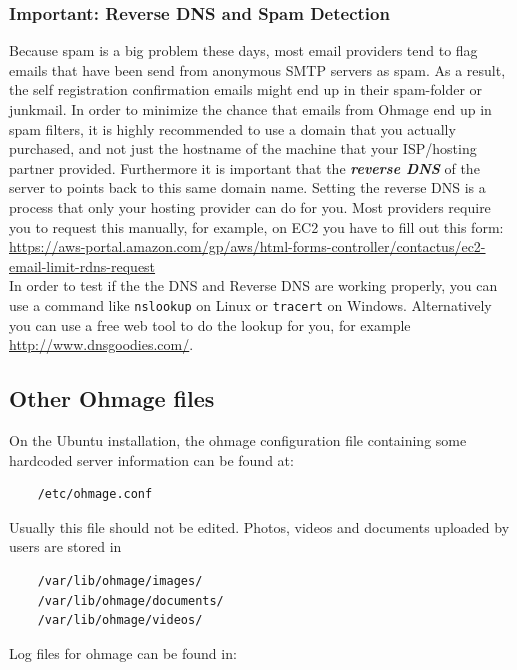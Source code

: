 \documentclass{scrartcl}
\begin{document}
\subsubsection{Important: Reverse DNS and Spam Detection}

Because spam is a big problem these days, most email providers tend to flag
emails that have been send from anonymous SMTP servers as spam. As a result,
the self registration confirmation emails might end up in their spam-folder or
junkmail. In order to minimize the chance that emails from Ohmage end up in spam
filters, it is highly recommended to use a domain that you actually purchased,
and not just the hostname of the machine that your ISP/hosting partner provided.
Furthermore it is important that the \emph{\textbf{reverse DNS}} of the server
to points back to this same domain name. Setting the reverse DNS is a process
that only your hosting provider can do for you. Most providers require you to
request this manually, for example, on EC2 you have to fill out this form: \\

{\footnotesize\url{https://aws-portal.amazon.com/gp/aws/html-forms-controller/contactus/ec2-email-limit-rdns-request}}
\\



\noindent In order to test if the the DNS and Reverse DNS are working properly,
you can use a command like \texttt{nslookup} on Linux or \texttt{tracert} on
Windows. Alternatively you can use a free web tool to do the lookup for you,
for example \url{http://www.dnsgoodies.com/}.


\subsection{Other Ohmage files}

On the Ubuntu installation, the ohmage configuration file containing some
hardcoded server information can be found at:

\begin{verbatim}
    /etc/ohmage.conf
\end{verbatim}

\noindent Usually this file should not be edited. Photos, videos and documents
uploaded by users are stored in

\begin{verbatim}
    /var/lib/ohmage/images/
    /var/lib/ohmage/documents/
    /var/lib/ohmage/videos/
\end{verbatim}
Log files for ohmage can be found in:
\end{document}
